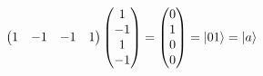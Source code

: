 \documentclass[a4paper, 10pt]{article}
\begin{document}
\begin{problem}
\begin{align*}
\begin{pmatrix}
		                              1 & -1 & -1 & 1
	                              \end{pmatrix} \begin{pmatrix}
		                                            1  \\
		                                            -1 \\
		                                            1  \\
		                                            -1
	                                            \end{pmatrix} = \begin{pmatrix}
		                                                            0 \\
		                                                            1 \\
		                                                            0 \\
		                                                            0
	                                                            \end{pmatrix} = \ket{01} = \ket{a}
\end{align*}
\end{problem}
\end{document}
